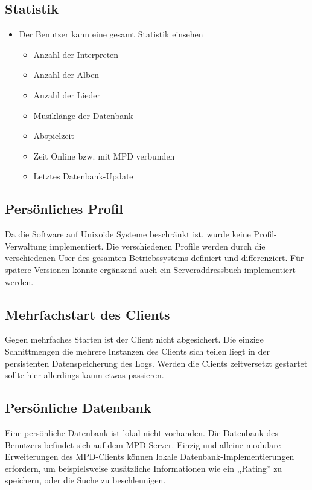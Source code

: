 \subsection{Statistik}
\begin{itemize}
    \item Der Benutzer kann eine gesamt Statistik einsehen
        \begin{itemize}
            \item Anzahl der Interpreten
            \item Anzahl der Alben
            \item Anzahl der Lieder
            \item Musiklänge der Datenbank
            \item Abspielzeit	
            \item Zeit Online bzw. mit MPD verbunden
            \item Letztes Datenbank-Update
        \end{itemize}
\end{itemize}

\subsection{Persönliches Profil}
Da die Software auf Unixoide Systeme beschränkt ist, wurde keine Profil-Verwaltung implementiert. Die
verschiedenen Profile werden durch die verschiedenen User des gesamten Betriebssystems definiert und differenziert.
Für spätere Versionen könnte ergänzend auch ein Serveraddressbuch implementiert werden.
\subsection{Mehrfachstart des Clients}
Gegen mehrfaches Starten ist der Client nicht abgesichert. Die einzige Schnittmengen die mehrere Instanzen des Clients sich teilen 
liegt in der persistenten Datenspeicherung des Logs. Werden die Clients zeitversetzt gestartet sollte hier allerdings kaum etwas passieren. 
\subsection{Persönliche Datenbank}
Eine persönliche Datenbank ist lokal nicht vorhanden. Die Datenbank des Benutzers befindet sich auf dem MPD-Server.
Einzig und alleine modulare Erweiterungen des MPD-Clients können lokale Datenbank-Implementierungen erfordern, um
beispielsweise zusätzliche Informationen wie ein ,,Rating'' zu speichern, oder die Suche zu beschleunigen.
